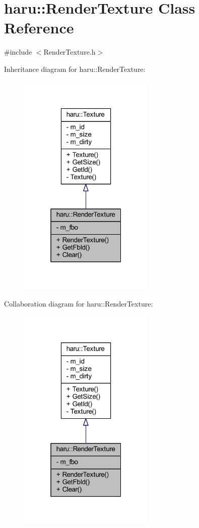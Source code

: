 \hypertarget{classharu_1_1_render_texture}{}\section{haru\+:\+:Render\+Texture Class Reference}
\label{classharu_1_1_render_texture}


{\ttfamily \#include $<$Render\+Texture.\+h$>$}



Inheritance diagram for haru\+:\+:Render\+Texture\+:\nopagebreak
\begin{figure}[H]
\begin{center}
\leavevmode
\includegraphics[width=184pt]{classharu_1_1_render_texture__inherit__graph}
\end{center}
\end{figure}


Collaboration diagram for haru\+:\+:Render\+Texture\+:\nopagebreak
\begin{figure}[H]
\begin{center}
\leavevmode
\includegraphics[width=184pt]{classharu_1_1_render_texture__coll__graph}
\end{center}
\end{figure}
